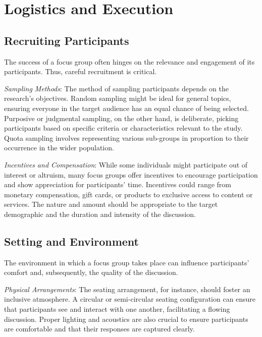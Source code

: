\documentclass[
  b5paper]{book}
\begin{document}
\hypertarget{logistics-and-execution}{%
\section{Logistics and Execution}\label{logistics-and-execution}}

\hypertarget{recruiting-participants}{%
\subsection*{Recruiting Participants}\label{recruiting-participants}}

The success of a focus group often hinges on the relevance and engagement of its participants. Thus, careful recruitment is critical.

\emph{Sampling Methods}: The method of sampling participants depends on the research's objectives. Random sampling might be ideal for general topics, ensuring everyone in the target audience has an equal chance of being selected. Purposive or judgmental sampling, on the other hand, is deliberate, picking participants based on specific criteria or characteristics relevant to the study. Quota sampling involves representing various sub-groups in proportion to their occurrence in the wider population.

\emph{Incentives and Compensation}: While some individuals might participate out of interest or altruism, many focus groups offer incentives to encourage participation and show appreciation for participants' time. Incentives could range from monetary compensation, gift cards, or products to exclusive access to content or services. The nature and amount should be appropriate to the target demographic and the duration and intensity of the discussion.

\hypertarget{setting-and-environment}{%
\subsection*{Setting and Environment}\label{setting-and-environment}}

The environment in which a focus group takes place can influence participants' comfort and, subsequently, the quality of the discussion.

\emph{Physical Arrangements}: The seating arrangement, for instance, should foster an inclusive atmosphere. A circular or semi-circular seating configuration can ensure that participants see and interact with one another, facilitating a flowing discussion. Proper lighting and acoustics are also crucial to ensure participants are comfortable and that their responses are captured clearly.
\end{document}
